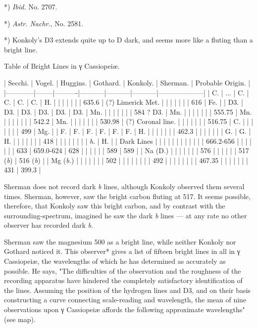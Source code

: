 \documentclass[a4paper, 12pt, oneside, polutonikogreek, english]{article}
\begin{document}
*) \emph{Ibid.} No. 2707.

*) \emph{Astr. Nachr.}, No. 2581.

*) Konkoly's D3 extends quite up to D dark, and seems more like a fluting than a bright line.

Table of Bright Lines in γ Cassiopeiæ.

| Secchi.  | Vogel. | Huggins. | Gothard. | Konkoly. | Sherman. | Probable Origin.  |
|------------|--------|----------|-----------|-----------|-----------|--------------------|
| C.     | ...  | C.    | C.    | C.    | C.    | H.         |
|      |    |     |      |      | 635.6   | (?) Limerick Met. |
|      |    |     |      |      | 616    | Fe.        |
| D3.    | D3.  | D3.   | D3.    | D3.    | D3.    | Mn.        |
|      |    |     |      |      | 584 ? D3. | Mn.        |
|      |    |     |      |      | 555.75  | Mn.        |
|      |    |     |      |      | 542.2   | Mn.        |
|      |    |     |      |      | 530.98  | (?) Coronal line. |
|      |    |     |      |      | 516.75  | C.         |
|      |    |     |      |      | 499    | Mg.        |
| F.     | F.   | F.    | F.    | F.    | F.    | H.         |
|      |    |     |      |      | 462.3   |          |
|      |    |     |      | G.    | G.    | H.         |
|      |    |     |      |      | 418    |          |
|      |    |     |      |      | \emph{h}.   | H.         |
| Dark Lines |    |     |      |      |      |          |
|      |    |     |      | 666.2-656 |      |          |
|      |    |     | 633    | 659.0-624 | 628    |          |
|      |    |     | 589    | 589    |      | Na (D.)      |
|      |    |     |      |      | 576    |          |
|      |    |     | 517 (\emph{b}) | 516 (\emph{b}) |      | Mg (\emph{b.})     |
|      |    |     |      |      | 502    |          |
|      |    |     |      |      | 492    |          |
|      |    |     |      |      | 467.35  |          |
|      |    |     |      | 431    | 399.3   |

Sherman does not record dark \emph{b} lines, although Konkoly observed them several times. Sherman, however, saw the bright carbon fluting at 517. It seems possible, therefore, that Konkoly saw this bright carbon, and by contrast with the surrounding-spectrum, imagined he saw the dark \emph{b} lines --- at any rate no other observer has recorded dark \emph{b}.

Sherman saw the magnesium 500 as a bright line, while neither Konkoly nor Gothard noticed it. This observer* gives a list of fifteen bright lines in all in γ Cassiopeiæ, the wavelengths of which he has determined as accurately as possible. He says, "The difficulties of the observation and the roughness of the recording apparatus have hindered the completely satisfactory identification of the lines. Assuming the position of the hydrogen lines and D3, and on their basis constructing a curve connecting scale-reading and wavelength, the mean of nine observations upon γ Cassiopeiæ affords the following approximate wavelengths" (see map).
\end{document}
